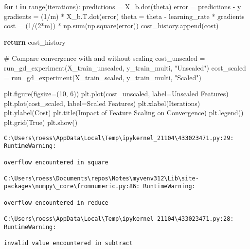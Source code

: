 \documentclass[
  letterpaper,
  DIV=11,
  numbers=noendperiod]{scrreprt}
\newenvironment{Shaded}{\begin{snugshade}}{\end{snugshade}}
\newcommand{\BuiltInTok}[1]{\textcolor[rgb]{0.00,0.23,0.31}{#1}}
\newcommand{\CommentTok}[1]{\textcolor[rgb]{0.37,0.37,0.37}{#1}}
\newcommand{\ControlFlowTok}[1]{\textcolor[rgb]{0.00,0.23,0.31}{\textbf{#1}}}
\newcommand{\DecValTok}[1]{\textcolor[rgb]{0.68,0.00,0.00}{#1}}
\newcommand{\KeywordTok}[1]{\textcolor[rgb]{0.00,0.23,0.31}{\textbf{#1}}}
\newcommand{\NormalTok}[1]{\textcolor[rgb]{0.00,0.23,0.31}{#1}}
\newcommand{\OperatorTok}[1]{\textcolor[rgb]{0.37,0.37,0.37}{#1}}
\newcommand{\StringTok}[1]{\textcolor[rgb]{0.13,0.47,0.30}{#1}}
\newcommand{\VariableTok}[1]{\textcolor[rgb]{0.07,0.07,0.07}{#1}}
\begin{document}
\begin{Shaded}
\begin{Highlighting}[]
    \ControlFlowTok{for}\NormalTok{ i }\KeywordTok{in} \BuiltInTok{range}\NormalTok{(iterations):}
\NormalTok{        predictions }\OperatorTok{=}\NormalTok{ X\_b.dot(theta)}
\NormalTok{        error }\OperatorTok{=}\NormalTok{ predictions }\OperatorTok{{-}}\NormalTok{ y}
\NormalTok{        gradients }\OperatorTok{=}\NormalTok{ (}\DecValTok{1}\OperatorTok{/}\NormalTok{m) }\OperatorTok{*}\NormalTok{ X\_b.T.dot(error)}
\NormalTok{        theta }\OperatorTok{=}\NormalTok{ theta }\OperatorTok{{-}}\NormalTok{ learning\_rate }\OperatorTok{*}\NormalTok{ gradients}
\NormalTok{        cost }\OperatorTok{=}\NormalTok{ (}\DecValTok{1}\OperatorTok{/}\NormalTok{(}\DecValTok{2}\OperatorTok{*}\NormalTok{m)) }\OperatorTok{*}\NormalTok{ np.}\BuiltInTok{sum}\NormalTok{(np.square(error))}
\NormalTok{        cost\_history.append(cost)}
    
    \ControlFlowTok{return}\NormalTok{ cost\_history}

\CommentTok{\# Compare convergence with and without scaling}
\NormalTok{cost\_unscaled }\OperatorTok{=}\NormalTok{ run\_gd\_experiment(X\_train\_unscaled, y\_train\_multi, }\StringTok{"Unscaled"}\NormalTok{)}
\NormalTok{cost\_scaled }\OperatorTok{=}\NormalTok{ run\_gd\_experiment(X\_train\_scaled, y\_train\_multi, }\StringTok{"Scaled"}\NormalTok{)}

\NormalTok{plt.figure(figsize}\OperatorTok{=}\NormalTok{(}\DecValTok{10}\NormalTok{, }\DecValTok{6}\NormalTok{))}
\NormalTok{plt.plot(cost\_unscaled, label}\OperatorTok{=}\StringTok{\textquotesingle{}Unscaled Features\textquotesingle{}}\NormalTok{)}
\NormalTok{plt.plot(cost\_scaled, label}\OperatorTok{=}\StringTok{\textquotesingle{}Scaled Features\textquotesingle{}}\NormalTok{)}
\NormalTok{plt.xlabel(}\StringTok{\textquotesingle{}Iterations\textquotesingle{}}\NormalTok{)}
\NormalTok{plt.ylabel(}\StringTok{\textquotesingle{}Cost\textquotesingle{}}\NormalTok{)}
\NormalTok{plt.title(}\StringTok{\textquotesingle{}Impact of Feature Scaling on Convergence\textquotesingle{}}\NormalTok{)}
\NormalTok{plt.legend()}
\NormalTok{plt.grid(}\VariableTok{True}\NormalTok{)}
\NormalTok{plt.show()}
\end{Highlighting}
\end{Shaded}

\begin{verbatim}
C:\Users\roess\AppData\Local\Temp\ipykernel_21104\433023471.py:29: RuntimeWarning:

overflow encountered in square

C:\Users\roess\Documents\repos\Notes\myvenv312\Lib\site-packages\numpy\_core\fromnumeric.py:86: RuntimeWarning:

overflow encountered in reduce

C:\Users\roess\AppData\Local\Temp\ipykernel_21104\433023471.py:28: RuntimeWarning:

invalid value encountered in subtract
\end{verbatim}
\end{document}
